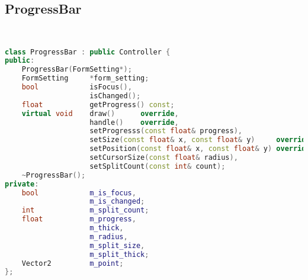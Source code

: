 \subsection{ProgressBar}
\begin{lstlisting}[language=C++]


class ProgressBar : public Controller {
public:
    ProgressBar(FormSetting*);
    FormSetting     *form_setting;
    bool            isFocus(),
                    isChanged();
    float           getProgress() const;
    virtual void    draw()      override,
                    handle()    override,
                    setProgresss(const float& progress),
                    setSize(const float& x, const float& y)     override,
                    setPosition(const float& x, const float& y) override,
                    setCursorSize(const float& radius),
                    setSplitCount(const int& count);
    ~ProgressBar();
private:
    bool            m_is_focus,
                    m_is_changed;
    int             m_split_count;
    float           m_progress,
                    m_thick,
                    m_radius,
                    m_split_size,
                    m_split_thick;
    Vector2         m_point;
};





\end{lstlisting}
